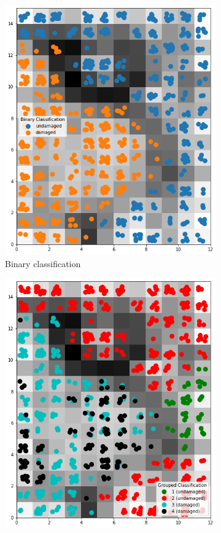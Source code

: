 \documentclass[twocolumn]{article}
\begin{document}
\begin{figure}
\begin{subfigure}{0.245\textwidth}
            \includegraphics[width=\textwidth]{som_2.png}
            \caption{Binary classification}
            \label{fig:som2}
      \end{subfigure}
      \begin{subfigure}{0.245\textwidth}
            \centering
            \includegraphics[width=\textwidth]{som_4.png}

\end{subfigure}
\end{figure}
\end{document}
